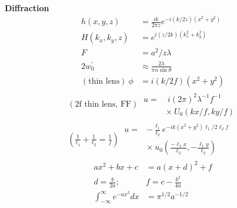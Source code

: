 \documentclass[12pt]{article}
\begin{document}
\begin{multicols}{2}
\textbf{Diffraction}
\begin{align}
  h(x, y, z) &= \frac{ik}{2\pi z} e^{-i (k / 2z)(x^2 + y^2)}\\
  H(k_x, k_y, z) &= e^{i (z / 2k)(k_x^2 + k_y^2)}\\
  F &= a^2 / z \lambda\\
  2 w_0^{\prime} &\approx \frac{2\lambda}{\pi n\sin\theta}\\
  (\textrm{thin lens}) \ \phi &= i(k/2f)(x^2+y^2)
\end{align}
\begin{align}
  (\textrm{2f thin lens, FF}) \
  \begin{aligned}
    u = &\ i(2\pi)^2\lambda^{-1}f^{-1}\\
    &\times \ U_0(kx/f,ky/f)
  \end{aligned}\\
  (\frac{1}{\ell_1} + \frac{1}{\ell_2} = \frac{1}{f}) \
  \begin{aligned}
    u = &-\frac{\ell_1}{\ell_2} e^{-ik(x^2+y^2)\ell_1/2\ell_2 f}\\
    &\times \ u_0(\frac{-\ell_1 x}{\ell_2}, -\frac{\ell_1 y}{\ell_2})
  \end{aligned}
\end{align}
\begin{align}
  ax^2 + bx + c &= a(x + d)^2 + f\\
  d = \frac{b}{2a}; \ &f = c - \frac{b^2}{4a}\\
  \int_{-\infty}^{\infty} e^{-ax^2} dx &= \pi^{1/2}a^{-1/2}
\end{align}


\end{multicols}
\end{document}
